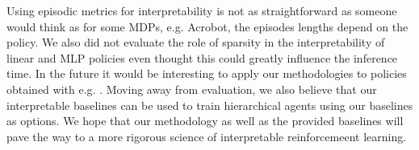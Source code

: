 Using episodic metrics for interpretability is not as straightforward as someone would think as for some MDPs, e.g. Acrobot, the episodes lengths depend on the policy.
We also did not evaluate the role of sparsity in the interpretability of linear and MLP policies even thought this could greatly influence the inference time.
In the future it would be interesting to apply our methodologies to policies obtained with e.g. \cite{sparsity}.
Moving away from evaluation, we also believe that our interpretable baselines can be used to train hierarchical agents \cite{hierarchical} using our baselines as options.
We hope that our methodology as well as the provided baselines will pave the way to a more rigorous science of interpretable reinforcemeent learning.
